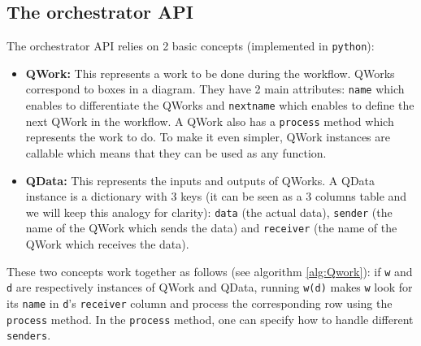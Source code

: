 \documentclass[10pt, conference, compsocconf]{IEEEtran}
\begin{document}
\subsection{The orchestrator API}
The orchestrator API  relies on 2 basic concepts (implemented in \texttt{python}): 
\begin{itemize}
\item \textbf{QWork:} This represents a work to be done during the workflow. QWorks correspond to boxes in a diagram. They have 2 main attributes: \texttt{name} which enables to differentiate the QWorks and \texttt{nextname} which enables to define the next QWork in the workflow. A QWork also has a \texttt{process} method which represents the work to do. To make it even simpler, QWork instances are callable which means that they can be used as any function. 
\item \textbf{QData:} This represents the inputs and outputs of QWorks. A QData instance is a dictionary with 3 keys (it can be seen as a 3 columns table and we will keep this analogy for clarity): \texttt{data} (the actual data), \texttt{sender} (the name of the QWork which sends the data) and \texttt{receiver} (the name of the QWork which receives the data). 
\end{itemize}
These two concepts work together as follows (see algorithm \ref{alg:Qwork}): if \texttt{w} and \texttt{d} are respectively instances of QWork and QData, running \texttt{w(d)} makes \texttt{w} look for its \texttt{name} in \texttt{d}'s \texttt{receiver} column and process the corresponding row using the \texttt{process} method. In the \texttt{process} method, one can specify how to handle different \texttt{senders}.
\end{document}
